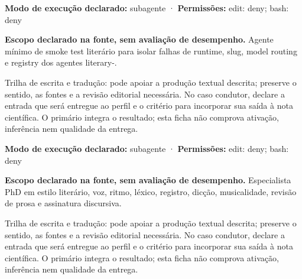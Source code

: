 \begin{arquitetura}
\textbf{Modo de execução declarado:} subagente · \textbf{Permissões:} edit: deny; bash: deny
\end{arquitetura}


\begin{descricao}
\textbf{Escopo declarado na fonte, sem avaliação de desempenho.}
Agente mínimo de smoke test literário para isolar falhas de runtime, slug, model routing e registry dos agentes literary-.
\end{descricao}

\begin{funcao}
Trilha de escrita e tradução: pode apoiar a produção textual descrita; preserve o sentido, as fontes e a revisão editorial necessária. No caso condutor, declare a entrada que será entregue ao perfil e o critério para incorporar sua saída à nota científica. O primário integra o resultado; esta ficha não comprova ativação, inferência nem qualidade da entrega.
\end{funcao}

\begin{arquitetura}
\textbf{Modo de execução declarado:} subagente · \textbf{Permissões:} edit: deny; bash: deny
\end{arquitetura}


\begin{descricao}
\textbf{Escopo declarado na fonte, sem avaliação de desempenho.}
Especialista PhD em estilo literário, voz, ritmo, léxico, registro, dicção, musicalidade, revisão de prosa e assinatura discursiva.
\end{descricao}

\begin{funcao}
Trilha de escrita e tradução: pode apoiar a produção textual descrita; preserve o sentido, as fontes e a revisão editorial necessária. No caso condutor, declare a entrada que será entregue ao perfil e o critério para incorporar sua saída à nota científica. O primário integra o resultado; esta ficha não comprova ativação, inferência nem qualidade da entrega.
\end{funcao}

